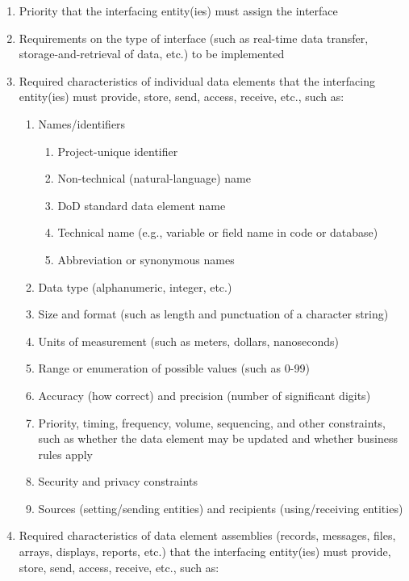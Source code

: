 \documentclass{fidata-report-template}
\begin{document}
\begin{enumerate}
\itemsep1pt\parskip0pt
\item
  Priority that the interfacing entity(ies) must assign the interface
\item
  Requirements on the type of interface (such as real-time data
  transfer, storage-and-retrieval of data, etc.) to be implemented
\item
  Required characteristics of individual data elements that the
  interfacing entity(ies) must provide, store, send, access, receive,
  etc., such as:

  \begin{enumerate}
  \itemsep1pt\parskip0pt
  \item
    Names/identifiers

    \begin{enumerate}
    \itemsep1pt\parskip0pt
    \item
      Project-unique identifier
    \item
      Non-technical (natural-language) name
    \item
      DoD standard data element name
    \item
      Technical name (e.g., variable or field name in code or database)
    \item
      Abbreviation or synonymous names
    \end{enumerate}
  \item
    Data type (alphanumeric, integer, etc.)
  \item
    Size and format (such as length and punctuation of a character
    string)
  \item
    Units of measurement (such as meters, dollars, nanoseconds)
  \item
    Range or enumeration of possible values (such as 0-99)
  \item
    Accuracy (how correct) and precision (number of significant digits)
  \item
    Priority, timing, frequency, volume, sequencing, and other
    constraints, such as whether the data element may be updated and
    whether business rules apply
  \item
    Security and privacy constraints
  \item
    Sources (setting/sending entities) and recipients (using/receiving
    entities)
  \end{enumerate}
\item
  Required characteristics of data element assemblies (records,
  messages, files, arrays, displays, reports, etc.) that the interfacing
  entity(ies) must provide, store, send, access, receive, etc., such as:


\end{enumerate}
\end{document}
